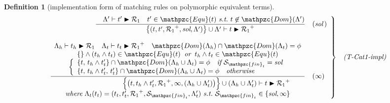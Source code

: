 \documentclass[12pt]{article}
\newtheorem{Definition}{Definition}[section]
\begin{document}
\begin{Definition}[implementation form of matching rules on
    polymorphic equivalent terms]
\begin{displaymath}
\begin{array}{c}
      \begin{array}{rl}
        \left. \begin{array}{rl}
          \dfrac{
            \quad \Lambda' \vdash t' \blacktriangleright \mathcal{R}_1 \quad
             t' \in \mathpzc{Equ}(t)\ \text{\it s.t.}\ t \not\in
              \mathpzc{Dom}(\Lambda')
          }{
            \bigl\{(t, t', {\mathcal{R}_1}^+, \text{\it sol}, \Lambda')
             \bigr\} \cup \Lambda' \vdash
              t \blacktriangleright {\mathcal{R}_1}^+
          }  &  (\text{\it sol}\,)  \\
          \\
          \dfrac{
            \begin{array}{c}
              \Lambda_h \vdash t_h \blacktriangleright \mathcal{R}_1
               \quad \Lambda_t \vdash t_t \blacktriangleright {\mathcal{R}_1}^+
                \quad \mathpzc{Dom}(\Lambda_h) \cap \mathpzc{Dom}(\Lambda_t)
                 = \phi  \\
              \{\} \wedge (t_h \wedge t_t) \in \mathpzc{Equ}(t)\;\;
               \text{\it or}\;\; t_h \wedge t_t \in \mathpzc{Equ}(t)  \\
              \left\{\begin{array}{l}
                \{t,\, t_h \wedge t'_t \} \cap \mathpzc{Dom}(
                 \Lambda_h \cup \Lambda_t) = \phi\quad \text{\it if}\
                  \mathcal{S}_{\mathpzc{fin}_t} = \text{\it sol}  \\
                \{t,\, t_h \wedge t'_t,\, t'_t \} \cap \mathpzc{Dom}(
                 \Lambda_h \cup \Lambda_t) = \phi\quad \text{\it otherwise}
              \end{array}\right.
            \end{array}
          }{
            \begin{array}{r}
              \Bigl\{\bigl(t, t_h \wedge t_t', {\mathcal{R}_1}^+, \infty,
               (\Lambda_h \cup \Lambda_t') \bigr) \Bigr\} \cup
                (\Lambda_h \cup \Lambda_t') \vdash
                 t \blacktriangleright {\mathcal{R}_1}^+  \\
              \text{\it where}\
               \Lambda_t(t_t) = (t_t, t_t', {\mathcal{R}_1}^+,
                \mathcal{S}_{\mathpzc{fin}_t}, \Lambda_t')\ \text{\it s.t.}\
                 \mathcal{S}_{\mathpzc{fin}_t} \in \{\text{\it sol}, \infty\}
            \end{array}
          }  &  (\infty)
        \end{array} \right\}  &  \text{\it (T-Cat1-impl)}
      \end{array}  \\
      \\
      

\end{array}
\end{displaymath}
\end{Definition}
\end{document}
